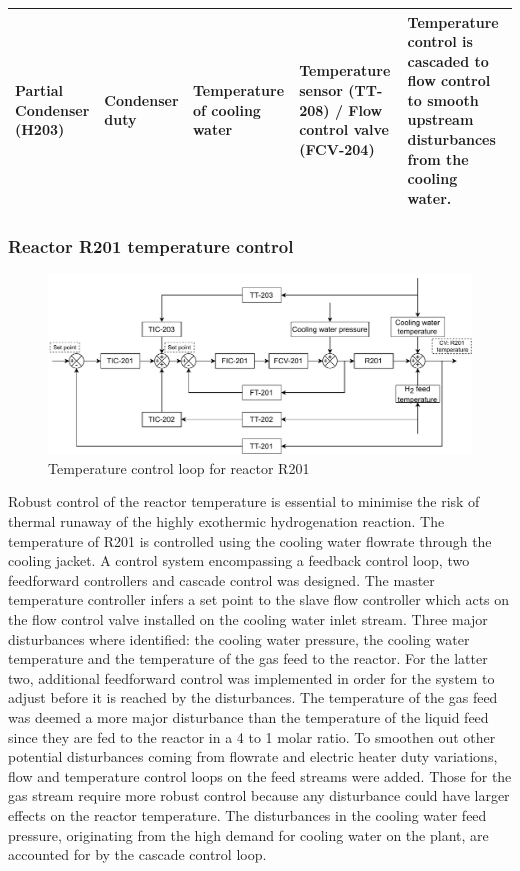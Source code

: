 \begin{table}[h]
{\begin{tabular}{@{}p{3cm}|p{3cm}|p{4cm}|p{5cm}|p{6cm}@{}}
Partial Condenser (H203)                    & Condenser duty                              & Temperature of cooling water                            & Temperature sensor (TT-208) / Flow control valve (FCV-204)                 & Temperature control is cascaded to flow control to smooth upstream   disturbances from the cooling water.                            \\ \bottomrule
\end{tabular}}
\end{table}


\subsubsection{Reactor R201 temperature control} %

\begin{figure}[h]
    \centering
    \includegraphics[width=\linewidth]{chapters/4-operation-control/4-Figures/R201-TC.pdf}
    \caption{Temperature control loop for reactor R201}
    \label{fig:R201-TC}
\end{figure}

Robust control of the reactor temperature is essential to minimise the risk of thermal runaway of the highly exothermic hydrogenation reaction. The temperature of R201 is controlled using the cooling water flowrate through the cooling jacket. A control system encompassing a feedback control loop, two feedforward controllers and cascade control was designed. The master temperature controller infers a set point to the slave flow controller which acts on the flow control valve installed on the cooling water inlet stream. Three major disturbances where identified: the cooling water pressure, the cooling water temperature and the temperature of the gas feed to the reactor. For the latter two, additional feedforward control was implemented in order for the system to adjust before it is reached by the disturbances. The temperature of the gas feed was deemed a more major disturbance than the temperature of the liquid feed since they are fed to the reactor in a 4 to 1 molar ratio. To smoothen out other potential disturbances coming from flowrate and electric heater duty variations, flow and temperature control loops on the feed streams were added. Those for the gas stream require more robust control because any disturbance could have larger effects on the reactor temperature. The disturbances in the cooling water feed pressure, originating from the high demand for cooling water on the plant, are accounted for by the cascade control loop.





